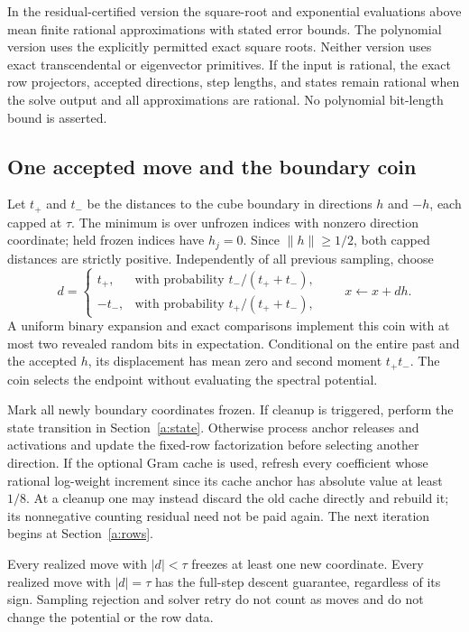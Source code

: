 \documentclass[11pt]{amsart}
\theoremstyle{definition}\newtheorem{definition}[theorem]{Definition}
\theoremstyle{remark}\newtheorem{remark}[theorem]{Remark}
\numberwithin{equation}{section}
\begin{document}
In the residual-certified version the square-root and exponential
evaluations above mean finite rational approximations with stated error bounds.
The polynomial version uses the explicitly permitted exact square roots.
Neither version uses exact transcendental or eigenvector primitives. If the input is rational, the exact row
projectors, accepted directions, step lengths, and states remain rational
when the solve output and all approximations are rational. No polynomial
bit-length bound is asserted.

\subsection{One accepted move and the boundary coin}\label{a:move}
Let $t_+$ and $t_-$ be the distances to the cube boundary in directions
$h$ and $-h$, each capped at $\tau$. The minimum is over unfrozen indices
with nonzero direction coordinate; held frozen indices have $h_j=0$.
Since $\|h\|\ge1/2$, both capped distances are strictly positive.
Independently of all previous sampling, choose
\[
 d=\begin{cases}
 t_+,&\text{with probability }t_-/(t_++t_-),\\
 -t_-,&\text{with probability }t_+/(t_++t_-),
 \end{cases}
 \qquad x\leftarrow x+dh.
\]
A uniform binary expansion and exact comparisons implement this coin with
at most two revealed random bits in expectation. Conditional on the entire
past and the accepted $h$, its displacement has mean zero and second
moment $t_+t_-$. The coin selects the endpoint without evaluating the spectral potential.

Mark all newly boundary coordinates frozen. If cleanup is triggered,
perform the state transition in Section~\ref{a:state}. Otherwise process
anchor releases and activations and update the fixed-row factorization
before selecting another direction. If the optional Gram cache is used,
refresh every coefficient whose rational log-weight increment since its
cache anchor has absolute value at least $1/8$. At a cleanup one may
instead discard the old cache directly and rebuild it; its nonnegative
counting residual need not be paid again. The next iteration begins at
Section~\ref{a:rows}.

Every realized move with $|d|<\tau$ freezes at least one new coordinate.
Every realized move with $|d|=\tau$ has the full-step descent guarantee,
regardless of its sign. Sampling rejection and solver retry do not count
as moves and do not change the potential or the row data.
\end{document}
